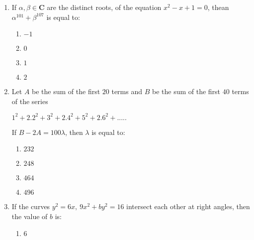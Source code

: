 \documentclass[journal,12pt,twocolumn]{IEEEtran}
\begin{document}
%
%
\begin{enumerate}[1.]
\item If $\alpha, \beta \in \textbf{C} $ are the distinct roots, of the equation $ x^2-x+1=0$, thean $ \alpha^{101} + \beta^{107} $ is equal to: 

\begin{enumerate}[(1)]
 
\item $
-1
$

\item $
0
$

\item $
1
$

\item $
2
$


\end{enumerate}

\item Let $A$ be the sum of the first $20$ terms and $B$ be the sum of the first $40$ terms of the series

$1^2+2.2^2+3^2+2.4^2+5^2+2.6^2+.....$

If $B-2A=100 \lambda$, then $\lambda $ is equal to:

\begin{enumerate}[(1)]
 
\item $
232
$

\item $
248
$

\item $
464
$

\item $
496
$


\end{enumerate}
 
\item If the curves $y^2=6x, \  9x^2+by^2=16 $ intersect each other at right angles, then the value of $b$ is:

\begin{enumerate}[(1)]
 
\item $
6
$


\end{enumerate}
\end{enumerate}
\end{document}
